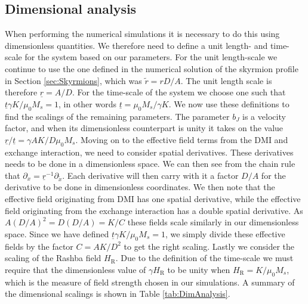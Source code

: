 \subsection{Dimensional analysis}
When performing the numerical simulations it is necessary to do this using dimensionless quantities. We therefore need to define a unit length- and time-scale for the system based on our parameters. For the unit length-scale we continue to use the one defined in the numerical solution of the skyrmion profile in Section \ref{sec:Skyrmions}, which was $\tilde{r} = rD/A$. The unit length scale is therefore $\underline{r}=A/D$. For the time-scale of the system we choose one such that $\underline{t}\gamma K/\mu_0 M_s = 1$, in other words $\underline{t}=\mu_0 M_s/\gamma K$. We now use these definitions to find the scalings of the remaining parameters. The parameter $b_J$ is a velocity factor, and when its dimensionless counterpart is unity it takes on the value $\underline{r}/\underline{t} = \gamma A K/D\mu_0 M_s$. Moving on to the effective field terms from the DMI and exchange interaction, we need to consider spatial derivatives. These derivatives needs to be done in a dimensionless space. We can then see from the chain rule that $\partial_x = \underline{r}^{-1}\partial_{\tilde{x}}$. Each derivative will then carry with it a factor $D/A$ for the derivative to be done in dimensionless coordinates. We then note that the effective field originating from DMI has one spatial derivative, while the effective field originating from the exchange interaction has a double spatial derivative. As $A(D/A)^2 = D (D/A) = K/C$ these fields scale similarly in our dimensionless space. Since we have defined $\underline{t}\gamma K/\mu_0 M_s = 1$, we simply divide these effective fields by the factor $C = AK/D^2$ to get the right scaling. Lastly we consider the scaling of the Rashba field $H_{\text{R}}$. Due to the definition of the time-scale we must require that the dimensionless value of $\gamma H_{\text{R}}$ to be unity when $H_{\text{R}} = K/\mu_0 M_s$, which is the measure of field strength chosen in our simulations. A summary of the dimensional scalings is shown in Table \ref{tab:DimAnalysis}.
